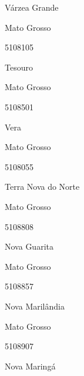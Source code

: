 \documentclass[
  letterpaper,
]{report}
\begin{document}
\n      

Várzea Grande

\n    

\n    

\n      

Mato Grosso

\n      

5108105

\n      

Tesouro

\n    

\n    

\n      

Mato Grosso

\n      

5108501

\n      

Vera

\n    

\n    

\n      

Mato Grosso

\n      

5108055

\n      

Terra Nova do Norte

\n    

\n    

\n      

Mato Grosso

\n      

5108808

\n      

Nova Guarita

\n    

\n    

\n      

Mato Grosso

\n      

5108857

\n      

Nova Marilândia

\n    

\n    

\n      

Mato Grosso

\n      

5108907

\n      

Nova Maringá

\n    

\n    
\end{document}
